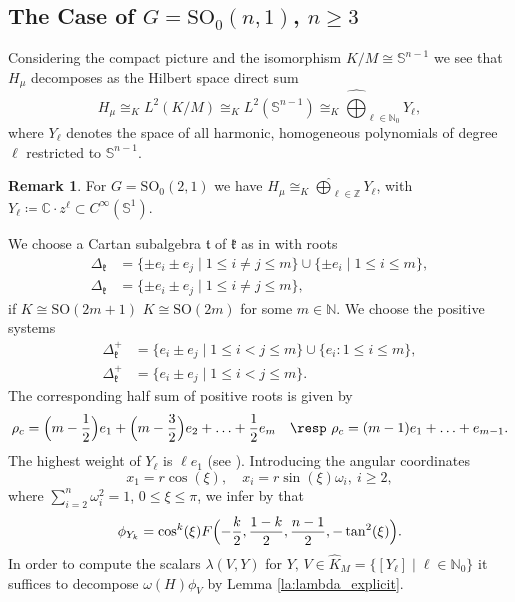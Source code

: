 \documentclass[JEP,XML,SOM,NoFloatCountersInSection,Unicode,published]{cedram}
\theoremstyle{definition}
\newtheorem{remark}[theorem]{Remark}
\newcommand{\mb}[1]{\ensuremath{\mathbb{#1}}}
\newcommand{\mf}[1]{\ensuremath{\mathfrak{#1}}}
\newcommand{\rhoc}{\ensuremath{\rho_c}}
\newcommand{\N}{\ensuremath{\mathbb{N}}}
\newcommand{\Z}{\ensuremath{\mathbb{Z}}}
\newcommand{\C}{\ensuremath{\mathbb{C}}}
\newcommand{\pst}[1]{\ensuremath{H_{#1}}}
\newcommand{\GSO}[1]{\ensuremath{\mathrm{SO}_0(#1,1)}}
\begin{document}
\subsection{\texorpdfstring{The Case of $G=\GSO{n}$, $n\geq 3$}{The Case of G=SO(n,1), n>=3}}
Considering the compact picture and the isomorphism $K/M\cong\mb S^{n-1}$ we see that $\pst{\mu}$ decomposes as the Hilbert space direct sum
\begin{equation}\label{eq:app_KM_sphere_iso_R}
\pst{\mu}\cong_KL^2(K/M)\cong_KL^2(\mb S^{n-1})\cong_K\widehat\bigoplus_{\ell\in\mathbb{N}_0}Y_\ell,
\end{equation}
where $Y_\ell$ denotes the space of all harmonic, homogeneous polynomials of degree $\ell$ restricted to $\mb S^{n-1}$.
\begin{remark}
For $G=\GSO{2}$ we have $\pst{\mu}\cong_K\widehat\bigoplus_{\ell\in\Z}Y_{\ell}$, with $Y_{\ell}\coloneqq\C\cdot z^\ell\subset C^\infty(\mb S^1)$.
\end{remark}
We choose a Cartan subalgebra $\mf t$ of $\mf k$ as in \cite[\S II.1 Ex.\,2, 4]{knapplie} with roots
\begin{align*}
\Delta_\mf k&=\{\pm e_i\pm e_j\mid 1\leq i\neq j\leq m\}\cup\{\pm e_i\mid 1\leq i\leq m\},\\
\tag*{\resp}
\Delta_\mf k&=\{\pm e_i\pm e_j\mid 1\leq i\neq j\leq m\},
\end{align*}
if $K\cong\mathrm{SO}(2m+1)$ \resp $K\cong\mathrm{SO}(2m)$ for some $m\in\N$. We choose the positive systems
\begin{align*}
\Delta^+_\mf k&=\{e_i\pm e_j\mid 1\leq i<j\leq m\}\cup\{e_i\colon 1\leq i\leq m\},\\
\tag*{\resp}
\Delta^+_\mf k&=\{e_i\pm e_j\mid 1\leq i<j\leq m\}.
\end{align*}
The corresponding half sum of positive roots is given by
\[
\rhoc=\Bigl(m-\frac12\Bigr)e_1+\Bigl(m-\frac32\Bigr)e_2+\ldots+\frac12 e_m\quad\text{\resp }\rhoc=(m-1)e_1+\ldots+e_{m-1}.
\]
The highest weight of $Y_\ell$ is $\ell e_1$ (see \eg \cite[Ex.\,1 of \S V.1, p.\,277]{knapplie}). Introducing the angular coordinates
\[
x_1=r\cos(\xi),\quad x_i=r\sin(\xi)\omega_i,\ i\geq2,
\]
where $\sum_{i=2}^n\omega_i^2=1$, $0\leq\xi\leq\pi$, we infer by \cite[Th.\,3.1(2)]{JW} that
\[
\phi_{Y_k}=\cos^k(\xi) F\Bigl(-\frac{k}{2},\frac{1-k}{2},\frac{n-1}{2},-\tan^2(\xi)\Bigr).
\]
In order to compute the scalars $\lambda(V,Y)$ for $Y,\,V\in\hat K_M=\{[Y_\ell]\mid\ell\in\N_0\}$ it suffices to decompose $\omega(H)\phi_V$ by Lemma \ref{la:lambda_explicit}.
\end{document}
